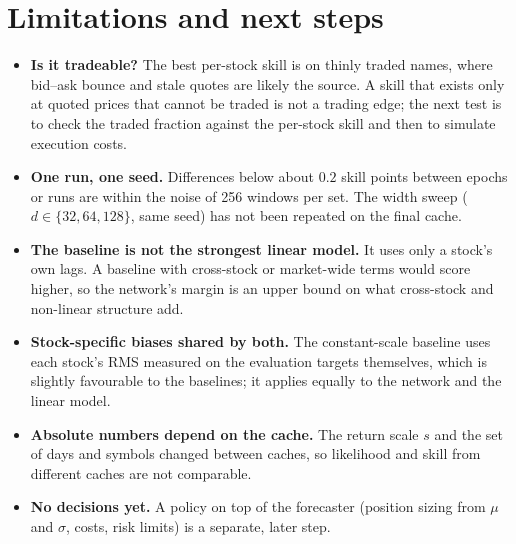 \documentclass[11pt]{article}
\begin{document}
\section{Limitations and next steps}

\begin{itemize}
  \item \textbf{Is it tradeable?} The best per-stock skill is on thinly traded names, where bid--ask bounce and stale quotes are likely the source. A skill that exists only at quoted prices that cannot be traded is not a trading edge; the next test is to check the traded fraction against the per-stock skill and then to simulate execution costs.
  \item \textbf{One run, one seed.} Differences below about $0.2$ skill points between epochs or runs are within the noise of 256 windows per set. The width sweep ($d\in\{32,64,128\}$, same seed) has not been repeated on the final cache.
  \item \textbf{The baseline is not the strongest linear model.} It uses only a stock's own lags. A baseline with cross-stock or market-wide terms would score higher, so the network's margin is an upper bound on what cross-stock and non-linear structure add.
  \item \textbf{Stock-specific biases shared by both.} The constant-scale baseline uses each stock's RMS measured on the evaluation targets themselves, which is slightly favourable to the baselines; it applies equally to the network and the linear model.
  \item \textbf{Absolute numbers depend on the cache.} The return scale $s$ and the set of days and symbols changed between caches, so likelihood and skill from different caches are not comparable.
  \item \textbf{No decisions yet.} A policy on top of the forecaster (position sizing from $\mu$ and $\sigma$, costs, risk limits) is a separate, later step.
\end{itemize}



\end{document}
